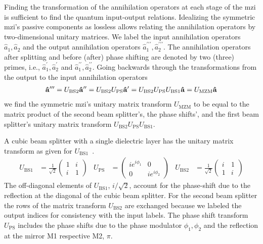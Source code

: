 Finding the transformation of the annihilation operators at each stage of the \gls{mzi} is sufficient to find the quantum input-output relations.
Idealizing the symmetric \gls{mzi}'s passive components as lossless allows relating the annihilation operators by two-dimensional unitary matrices.
We label the input annihilation operators $\hat{a}_1,\hat{a}_2$ and the output annihilation operators $\hat{a}_1^{\prime\prime\prime},\hat{a}_2^{\prime\prime\prime}$.
The annihilation operators after splitting and before (after) phase shifting are denoted by two (three) primes, i.e., $\hat{a}_1^{\prime},\hat{a}_2^{\prime}$ and $\hat{a}_1^{\prime\prime},\hat{a}_2^{\prime\prime}$.
Going backwards through the transformations from the output to the input annihilation operators
\begin{equation}
	\begin{split}
		\vb{\hat{a}}^{\prime\prime\prime}
		=
		U_\text{BS2}
		\vb{\hat{a}}^{\prime\prime}
		=
		U_\text{BS2}
		U_\text{PS}
		\vb{\hat{a}}^{\prime}
		=
		U_\text{BS2}
		U_\text{PS}
		U_\text{BS1}
		\vb{\hat{a}}
		=
		U_\text{MZM}
		\vb{\hat{a}}
	\end{split}
\end{equation}
we find the symmetric \gls{mzi}'s unitary matrix transform $U_\text{MZM}$ to be equal to the matrix product of the second beam splitter's, the phase shifts', and the first beam splitter's unitary matrix transform  $U_\text{BS2}U_\text{PS}U_\text{BS1}$.

A cubic beam splitter with a single dielectric layer has the unitary matrix transform as given for $U_\text{BS1}$~\cite[p.~139]{Gerry2005}.
\begin{align}
	U_\text{BS1}
	&=
	\frac{1}{\sqrt{2}}
	\begin{pmatrix}
		1 & i \\
		i & 1
	\end{pmatrix}
	&
	U_\text{PS}
	&=
	\begin{pmatrix}
		ie^{i\phi_1} & 0 \\
		0 & ie^{i\phi_2}
	\end{pmatrix}
	&
	U_\text{BS2}
	&=
	\frac{1}{\sqrt{2}}
	\begin{pmatrix}
		i & 1 \\
		1 & i
	\end{pmatrix}
\end{align}
The off-diagonal elements of $U_\text{BS1}$, $i/\sqrt{2}$, account for the phase-shift due to the reflection at the diagonal of the cubic beam splitter.
For the second beam splitter the rows of the matrix transform $U_\text{BS2}$ are exchanged because we labeled the output indices for consistency with the input labels.
The phase shift transform $U_\text{PS}$ includes the phase shifts due to the phase modulator $\phi_1,\phi_2$ and the reflection at the mirror M1 respective M2, $\pi$.

